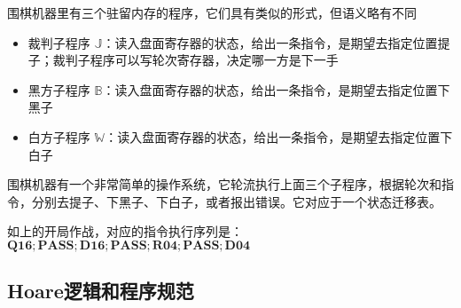 \setcounter{gomove}{-1}
\begin{center}
    \begin{psgoboard}
    \end{psgoboard}
\end{center}

围棋机器里有三个驻留内存的程序，它们具有类似的形式，但语义略有不同

\begin{itemize}
    \item 裁判子程序 $\mathbb{J}$：读入盘面寄存器的状态，给出一条指令，是期望去指定位置提子；裁判子程序可以写轮次寄存器，决定哪一方是下一手
    \item 黑方子程序 $\mathbb{B}$：读入盘面寄存器的状态，给出一条指令，是期望去指定位置下黑子
    \item 白方子程序 $\mathbb{W}$：读入盘面寄存器的状态，给出一条指令，是期望去指定位置下白子
\end{itemize}

围棋机器有一个非常简单的操作系统，它轮流执行上面三个子程序，根据轮次和指令，分别去提子、下黑子、下白子，或者报出错误。它对应于一个状态迁移表。

如上的开局作战，对应的指令执行序列是：$\mathbf{Q16; PASS; D16; PASS; R04; PASS; D04}$


\subsection{Hoare逻辑和程序规范}
















